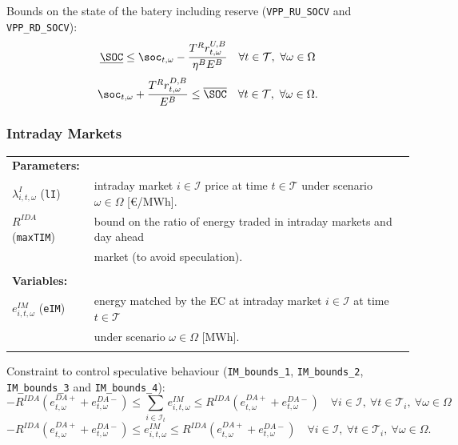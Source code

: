 Bounds on the state of the batery including reserve (\verb|VPP_RU_SOCV| and \verb|VPP_RD_SOCV|):
\begin{equation} \label{EQ:VPP_RU_SOCV1}
	\underline{\SOC} \leq \soc_{t, \omega} - \frac{T^R r^{U, B}_{t, \omega}}{\eta^B E^B} \quad \forall t \in \mathcal{T}, \ \forall \omega \in \Omega
\end{equation}
\begin{equation} \label{EQ:VPP_RD_SOCV1}
	\soc_{t, \omega} + \frac{T^R r^{D, B}_{t, \omega} }{E^B} \leq \overline{\SOC} \quad \forall t \in \mathcal{T}, \ \forall \omega \in \Omega.
\end{equation}

\subsubsection{Intraday Markets}

\begin{tabularx}{\textwidth}{l X}
    
    \textbf{Parameters:} \\
    	$\lambda^I_{i, t, \omega}$ (\texttt{lI}) & intraday market $i \in \mathcal{I}$ price at time $t \in \mathcal{T}$ under scenario $\omega \in \Omega$ [\euro/MWh]. \\
	$R^{IDA}$ (\texttt{maxTIM}) & bound on the ratio of energy traded in intraday markets and day ahead \\
	& market (to avoid speculation).\\
    \\ 
       
    \textbf{Variables:} \\
    $e^{IM}_{i, t, \omega}$ (\texttt{eIM}) & energy matched by the EC at intraday market $i \in \mathcal{I}$ at time $t \in \mathcal{T}$ \\
    & under scenario $\omega \in \Omega$ [MWh]. \\
	\\
\end{tabularx}

Constraint to control speculative behaviour (\verb|IM_bounds_1|, \verb|IM_bounds_2|, \verb|IM_bounds_3| and \verb|IM_bounds_4|):
\begin{equation} \label{EQ:DM_IM_11}
	-R^{IDA} (e^{DA+}_{t, \omega} + e^{DA-}_{t, \omega})  \leq \sum_{i \in \mathcal{I}_t} e^{IM}_{i, t, \omega} \leq R^{IDA} (e^{DA+}_{t, \omega} + e^{DA-}_{t, \omega}) \quad  \forall i \in \mathcal{I},  \ \forall t \in \mathcal{T}_i, \ \forall \omega \in \Omega
\end{equation}
\begin{equation} \label{EQ:IM_bounds_3-41}
	-R^{IDA} (e^{DA+}_{t, \omega} + e^{DA-}_{t, \omega}) \leq e^{IM}_{i, t, \omega} \leq R^{IDA} (e^{DA+}_{t, \omega} + e^{DA-}_{t, \omega}) \quad \forall i \in \mathcal{I}, \ \forall t \in \mathcal{T}_i, \ \forall \omega \in \Omega.
\end{equation}

